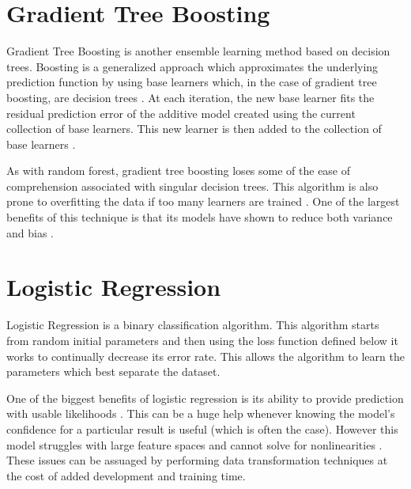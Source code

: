\section{Gradient Tree Boosting}
Gradient Tree Boosting is another ensemble learning method based on decision trees. Boosting is a generalized approach which approximates the underlying prediction function by using base learners which, in the case of gradient tree boosting, are decision trees \cite{gradientBoostingOG}. At each iteration, the new base learner fits the residual prediction error of the additive model created using the current collection of base learners. This new learner is then added to the collection of base learners \cite{gradientBoostingOG}.

As with random forest, gradient tree boosting loses some of the ease of comprehension associated with singular decision trees. This algorithm is also prone to overfitting the data if too many learners are trained \cite{gradientBoostingDetails}. One of the largest benefits of this technique is that its models have shown to reduce both variance and bias \cite{gradientBoostingDetails}.



\section{Logistic Regression}
Logistic Regression is a binary classification algorithm. This algorithm starts from random initial parameters and then using the loss function defined below it works to continually decrease its error rate. This allows the algorithm to learn the parameters which best separate the dataset.

One of the biggest benefits of logistic regression is its ability to provide prediction with usable likelihoods \cite{LogisticRegressionOG}. This can be a huge help whenever knowing the model's confidence for a particular result is useful (which is often the case). However this model struggles with large feature spaces and cannot solve for nonlinearities \cite{LogisticRegressionDimensionaliy}. These issues can be assuaged by performing data transformation techniques at the cost of added development and training time.

